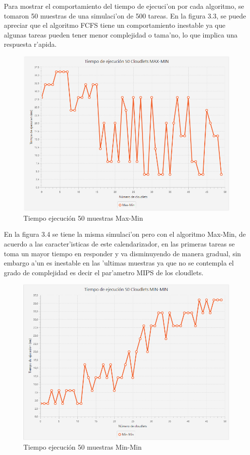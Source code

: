 \bigskip
Para mostrar el comportamiento del tiempo de ejecuci'on por cada algoritmo, se tomaron 50 muestras de una simulaci'on de 500 tareas. En la figura 3.3, se puede apreciar que el algoritmo FCFS tiene un comportamiento inestable ya que algunas tareas pueden tener menor complejidad o tama'no, lo que implica una respuesta r'apida.

\begin{figure}
	\caption{Tiempo ejecución 50 muestras Max-Min}
	\centering
	\includegraphics[scale=0.5]{media/max-min}
\end{figure}

\bigskip
 En la figura 3.4 se tiene la misma simulaci'on pero con el algoritmo Max-Min, de acuerdo a las caracter'isticas de este calendarizador, en las primeras tareas se toma un mayor tiempo en responder y va disminuyendo de manera gradual, sin embargo a'un es inestable en las 'ultimas muestras ya que no se contempla el grado de complejidad es decir el par'ametro MIPS de los cloudlets.

\begin{figure}
	\caption{Tiempo ejecución 50 muestras Min-Min}
	\centering
	\includegraphics[scale=0.5]{media/min-min}
\end{figure}

